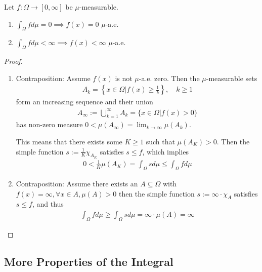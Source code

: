 \begin{prop} \label{prop:integral-and-zero}
  Let $f: \Omega \to [0,\infty]$ be $\mu$-measurable.
  \begin{enumerate}
    \item $\int_{\Omega} f d \mu = 0 \implies f(x) = 0$ $\mu$-a.e.
    \item $\int_{\Omega} f d \mu < \infty \implies f(x) < \infty$ $\mu$-a.e.
  \end{enumerate}
\end{prop}
\begin{proof}
\begin{enumerate}
  \item Contraposition: Assume $f(x)$ is not $\mu$-a.e. zero. Then the $\mu$-measurable sets
    \begin{align*}
      A_k = \left\{x \in \Omega \big\vert f(x) \geq \frac{1}{k}\right\}, \quad k \geq 1
    \end{align*}
    form an increasing sequence and their union
    \begin{align*}
      A_{\infty} := \bigcup_{k=1}^{\infty} A_k = \{x \in \Omega \big\vert f(x) > 0\}
    \end{align*}
    has non-zero measure $0 < \mu(A_{\infty}) = \lim_{k \to \infty} \mu(A_k)$.

    This means that there exists some $K \geq 1$ such that $\mu(A_K) > 0$.
    Then the simple function 
    $s := \frac{1}{K} \chi_{A_K}$
    satisfies $s \leq f$, which implies
    \begin{align*}
      0 < \frac{1}{K} \mu(A_K) = \int_{\Omega} s d \mu \leq \int_{\Omega} f d \mu
    \end{align*}
  \item Contraposition: Assume there exists an $A \subseteq \Omega$ with
    $f(x) = \infty, \forall x \in A, \mu(A) > 0$
    then the simple function
    $s := \infty \cdot \chi_{A}$ satisfies $s \leq f$, and thus
    \begin{align*}
      \int_{\Omega} f d \mu \geq \int_{\Omega} s d \mu = \infty \cdot \mu(A) = \infty
    \end{align*}
\end{enumerate}
\end{proof}

\subsection{More Properties of the Integral}


